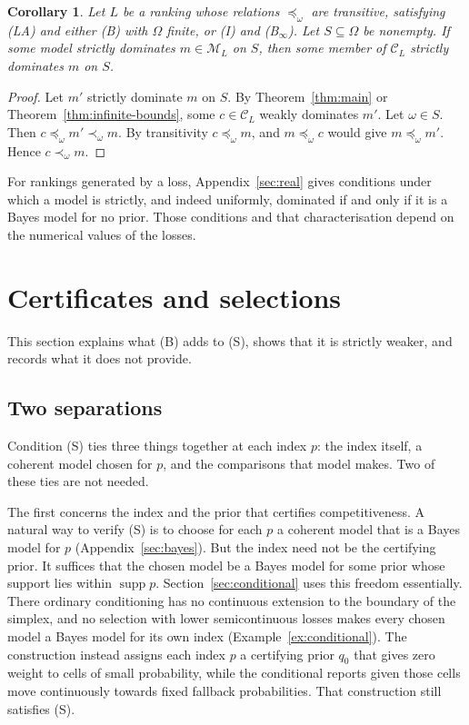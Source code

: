 \documentclass[11pt]{article}
\newtheorem{corollary}[theorem]{Corollary}
\theoremstyle{definition}
\theoremstyle{remark}
\newcommand{\M}{\mathcal M}
\newcommand{\C}{\mathcal C}
\newcommand{\supp}{\operatorname{supp}}
\begin{document}
\begin{corollary}\label{cor:strict-ordinal}
Let $L$ be a ranking whose relations $\preceq_\omega$ are transitive, satisfying (LA) and either (B) with $\Omega$ finite, or (I) and (B$_\infty$). Let $S\subseteq\Omega$ be nonempty. If some model strictly dominates $m\in\M_L$ on $S$, then some member of $\C_L$ strictly dominates $m$ on $S$.
\end{corollary}
\begin{proof}
Let $m'$ strictly dominate $m$ on $S$. By Theorem~\ref{thm:main} or Theorem~\ref{thm:infinite-bounds}, some $c\in\C_L$ weakly dominates $m'$. Let $\omega\in S$. Then $c\preceq_\omega m'\prec_\omega m$. By transitivity $c\preceq_\omega m$, and $m\preceq_\omega c$ would give $m\preceq_\omega m'$. Hence $c\prec_\omega m$.
\end{proof}
For rankings generated by a loss, Appendix~\ref{sec:real} gives conditions under which a model is strictly, and indeed uniformly, dominated if and only if it is a Bayes model for no prior. Those conditions and that characterisation depend on the numerical values of the losses.

\section{Certificates and selections}\label{sec:compare}
This section explains what (B) adds to (S), shows that it is strictly weaker, and records what it does not provide.

\subsection{Two separations}\label{sec:separations}
Condition (S) ties three things together at each index $p$: the index itself, a coherent model chosen for $p$, and the comparisons that model makes. Two of these ties are not needed.

The first concerns the index and the prior that certifies competitiveness. A natural way to verify (S) is to choose for each $p$ a coherent model that is a Bayes model for $p$ (Appendix~\ref{sec:bayes}). But the index need not be the certifying prior. It suffices that the chosen model be a Bayes model for some prior whose support lies within $\supp p$. Section~\ref{sec:conditional} uses this freedom essentially. There ordinary conditioning has no continuous extension to the boundary of the simplex, and no selection with lower semicontinuous losses makes every chosen model a Bayes model for its own index (Example~\ref{ex:conditional}). The construction instead assigns each index $p$ a certifying prior $q_0$ that gives zero weight to cells of small probability, while the conditional reports given those cells move continuously towards fixed fallback probabilities. That construction still satisfies (S).
\end{document}
